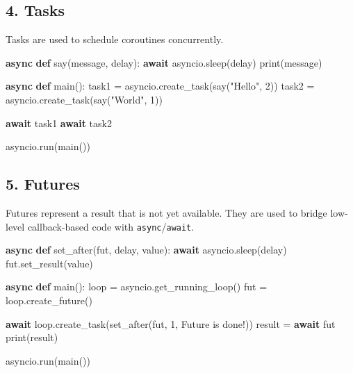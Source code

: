 \documentclass[
  letterpaper,
  DIV=11,
  numbers=noendperiod]{scrreprt}
\newenvironment{Shaded}{\begin{snugshade}}{\end{snugshade}}
\newcommand{\BuiltInTok}[1]{\textcolor[rgb]{0.00,0.23,0.31}{#1}}
\newcommand{\ControlFlowTok}[1]{\textcolor[rgb]{0.00,0.23,0.31}{\textbf{#1}}}
\newcommand{\DecValTok}[1]{\textcolor[rgb]{0.68,0.00,0.00}{#1}}
\newcommand{\KeywordTok}[1]{\textcolor[rgb]{0.00,0.23,0.31}{\textbf{#1}}}
\newcommand{\NormalTok}[1]{\textcolor[rgb]{0.00,0.23,0.31}{#1}}
\newcommand{\OperatorTok}[1]{\textcolor[rgb]{0.37,0.37,0.37}{#1}}
\newcommand{\StringTok}[1]{\textcolor[rgb]{0.13,0.47,0.30}{#1}}
\begin{document}
\subsection{4. Tasks}\label{tasks}

Tasks are used to schedule coroutines concurrently.

\begin{Shaded}
\begin{Highlighting}[]
\ControlFlowTok{async} \KeywordTok{def}\NormalTok{ say(message, delay):}
    \ControlFlowTok{await}\NormalTok{ asyncio.sleep(delay)}
    \BuiltInTok{print}\NormalTok{(message)}

\ControlFlowTok{async} \KeywordTok{def}\NormalTok{ main():}
\NormalTok{    task1 }\OperatorTok{=}\NormalTok{ asyncio.create\_task(say(}\StringTok{"Hello"}\NormalTok{, }\DecValTok{2}\NormalTok{))}
\NormalTok{    task2 }\OperatorTok{=}\NormalTok{ asyncio.create\_task(say(}\StringTok{"World"}\NormalTok{, }\DecValTok{1}\NormalTok{))}

    \ControlFlowTok{await}\NormalTok{ task1}
    \ControlFlowTok{await}\NormalTok{ task2}

\NormalTok{asyncio.run(main())}
\end{Highlighting}
\end{Shaded}

\subsection{5. Futures}\label{futures}

Futures represent a result that is not yet available. They are used to
bridge low-level callback-based code with \texttt{async}/\texttt{await}.

\begin{Shaded}
\begin{Highlighting}[]
\ControlFlowTok{async} \KeywordTok{def}\NormalTok{ set\_after(fut, delay, value):}
    \ControlFlowTok{await}\NormalTok{ asyncio.sleep(delay)}
\NormalTok{    fut.set\_result(value)}

\ControlFlowTok{async} \KeywordTok{def}\NormalTok{ main():}
\NormalTok{    loop }\OperatorTok{=}\NormalTok{ asyncio.get\_running\_loop()}
\NormalTok{    fut }\OperatorTok{=}\NormalTok{ loop.create\_future()}

    \ControlFlowTok{await}\NormalTok{ loop.create\_task(set\_after(fut, }\DecValTok{1}\NormalTok{, }\StringTok{\textquotesingle{}Future is done!\textquotesingle{}}\NormalTok{))}
\NormalTok{    result }\OperatorTok{=} \ControlFlowTok{await}\NormalTok{ fut}
    \BuiltInTok{print}\NormalTok{(result)}

\NormalTok{asyncio.run(main())}
\end{Highlighting}
\end{Shaded}
\end{document}
